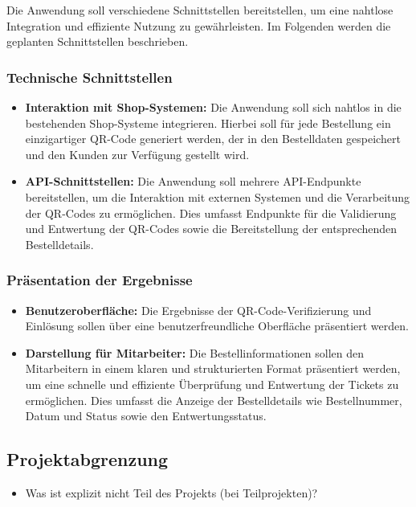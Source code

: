 Die Anwendung soll verschiedene Schnittstellen bereitstellen, um eine nahtlose Integration und effiziente Nutzung zu gewährleisten. Im Folgenden werden die geplanten Schnittstellen beschrieben.

\subsubsection{Technische Schnittstellen}

\begin{itemize}
    \item \textbf{Interaktion mit Shop-Systemen:} Die Anwendung soll sich nahtlos in die bestehenden Shop-Systeme integrieren. Hierbei soll für jede Bestellung ein einzigartiger QR-Code generiert werden, der in den Bestelldaten gespeichert und den Kunden zur Verfügung gestellt wird.
    \item \textbf{API-Schnittstellen:} Die Anwendung soll mehrere API-Endpunkte bereitstellen, um die Interaktion mit externen Systemen und die Verarbeitung der QR-Codes zu ermöglichen. Dies umfasst Endpunkte für die Validierung und Entwertung der QR-Codes sowie die Bereitstellung der entsprechenden Bestelldetails.
\end{itemize}

\subsubsection{Präsentation der Ergebnisse}

\begin{itemize}
    \item \textbf{Benutzeroberfläche:} Die Ergebnisse der QR-Code-Verifizierung und Einlösung sollen über eine benutzerfreundliche Oberfläche präsentiert werden.
    \item \textbf{Darstellung für Mitarbeiter:} Die Bestellinformationen sollen den Mitarbeitern in einem klaren und strukturierten Format präsentiert werden, um eine schnelle und effiziente Überprüfung und Entwertung der Tickets zu ermöglichen. Dies umfasst die Anzeige der Bestelldetails wie Bestellnummer, Datum und Status sowie den Entwertungsstatus.
\end{itemize}


\subsection{Projektabgrenzung} 
\label{sec:Projektabgrenzung}
\begin{itemize}
	\item Was ist explizit nicht Teil des Projekts (\insb bei Teilprojekten)?
\end{itemize}
